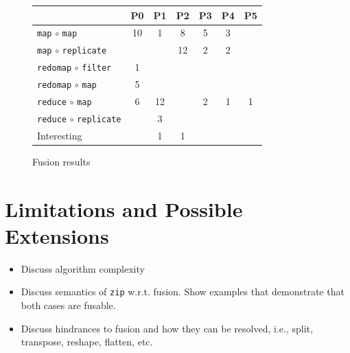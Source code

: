 \documentclass{sigplanconf}  %
\begin{document}
\begin{figure}
\begin{center}
\begin{tabular}{l|c|c|c|c|c|c}
& P0 & P1 & P2 & P3 & P4 & P5 \\\hline\hline
{\tt map} $\circ$ {\tt map}          & 10 & 1  & 8  & 5 & 3  &   \\\hline
{\tt map} $\circ$ {\tt replicate}    &    &    & 12 & 2 & 2  &   \\\hline
{\tt redomap} $\circ$ {\tt filter}   & 1  &    &    &   &    &   \\\hline
{\tt redomap} $\circ$ {\tt map}      & 5  &    &    &   &    &   \\\hline
{\tt reduce} $\circ$ {\tt map}       & 6  & 12 &    & 2 & 1  & 1 \\\hline
{\tt reduce} $\circ$ {\tt replicate} &    & 3  &    &   &    &   \\\hline\hline
Interesting            &    & 1  & 1  &   &    &   \\
\end{tabular}
\end{center}
\caption{Fusion results}
\label{fig:fusion}
\end{figure}

\section{Limitations and Possible Extensions}
\label{sec:Discuss}

\begin{itemize}
    \item Discuss algorithm complexity
    \item Discuss semantics of {\tt zip} w.r.t. fusion. Show examples that
            demonstrate that both cases are fusable.
    \item Discuss hindrances to fusion and how they can be resolved,
            i.e., split, transpose, reshape, flatten, etc. 
\end{itemize}
\end{document}
